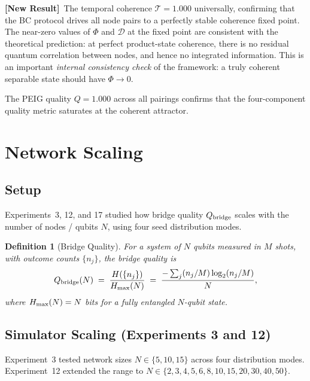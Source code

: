 \documentclass[12pt]{article}
\newtheorem{definition}{Definition}
\newcommand{\newresult}{\textbf{[New Result]}}
\begin{document}
\newresult\ The temporal coherence $\mathcal{T} = 1.000$ universally,
confirming that the BC protocol drives all node pairs to a perfectly
stable coherence fixed point.  The near-zero values of $\Phi$ and
$\mathcal{D}$ at the fixed point are consistent with the theoretical
prediction: at perfect product-state coherence, there is no residual
quantum correlation between nodes, and hence no integrated information.
This is an important \textit{internal consistency check} of the framework:
a truly coherent separable state should have $\Phi \to 0$.

The PEIG quality $Q = 1.000$ across all pairings confirms that the
four-component quality metric saturates at the coherent attractor.

\section{Network Scaling}
\label{sec:scaling}

\subsection{Setup}

Experiments~3, 12, and 17 studied how bridge quality $Q_{\rm bridge}$
scales with the number of nodes / qubits $N$, using four seed
distribution modes.

\begin{definition}[Bridge Quality]
For a system of $N$ qubits measured in $M$ shots, with outcome
counts $\{n_j\}$, the \emph{bridge quality} is
\begin{equation}
Q_{\rm bridge}(N) \;=\;
\frac{H(\{n_j\})}{H_{\rm max}(N)} \;=\;
\frac{-\sum_j (n_j/M)\log_2(n_j/M)}{N},
\label{eq:bridge}
\end{equation}
where $H_{\rm max}(N) = N$ bits for a fully entangled $N$-qubit state.
\end{definition}

\subsection{Simulator Scaling (Experiments 3 and 12)}

Experiment~3 tested network sizes $N \in \{5, 10, 15\}$ across four
distribution modes.  Experiment~12 extended the range to
$N \in \{2,3,4,5,6,8,10,15,20,30,40,50\}$.
\end{document}
